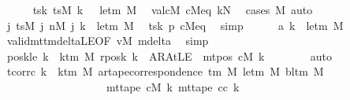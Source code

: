 \begin{isabellebody}
\ \ \ \ \isamarkupfalse%
\ tsk{}{\isacharcolon}{\kern0pt}\ {\isachardoublequoteopen}tsM\ k\ {}\ {\isacharequal}{\kern0pt}\ le{\isacharunderscore}{\kern0pt}tm\ M{\isachardoublequoteclose}\ \isamarkupfalse%
\ valcM\ cM{\isacharunderscore}{\kern0pt}eq\ kN\ \isamarkupfalse%
\ {\isacharparenleft}{\kern0pt}cases\ M{\isacharparenright}{\kern0pt}\ auto\isanewline
\ \ \ \ \isamarkupfalse%
\ {\isachardoublequoteopen}{\isacharparenleft}{\kern0pt}{\isasymlambda}j{\isachardot}{\kern0pt}\ tsM\ j\ {\isacharparenleft}{\kern0pt}nM\ j{\isacharparenright}{\kern0pt}{\isacharparenright}{\kern0pt}\ k\ {\isacharequal}{\kern0pt}\ le{\isacharunderscore}{\kern0pt}tm\ M{\isachardoublequoteclose}\ \isamarkupfalse%
\ tsk{}\ p{}\ cM{\isacharunderscore}{\kern0pt}eq\ \isamarkupfalse%
\ simp\isanewline
\ \ \ \ \isamarkupfalse%
\ {\isachardoublequoteopen}a{\isacharprime}{\kern0pt}\ k\ {\isacharequal}{\kern0pt}\ le{\isacharunderscore}{\kern0pt}tm\ M{\isachardoublequoteclose}\ \isamarkupfalse%
\ valid{\isacharunderscore}{\kern0pt}mttm{\isacharunderscore}{\kern0pt}deltaLE{\isacharbrackleft}{\kern0pt}OF\ vM\ mdelta{\isacharbrackright}{\kern0pt}\ \isamarkupfalse%
\ simp\isanewline
\ \ \isamarkupfalse%
\isanewline
\ \ \isamarkupfalse%
\ poskle{\isacharcolon}{\kern0pt}\ {\isachardoublequoteopen}{\isasymforall}k\ {\isacharless}{\kern0pt}\ k{\isacharunderscore}{\kern0pt}tm\ M{\isachardot}{\kern0pt}\ {\isacharquery}{\kern0pt}rposk\ k\ {\isacharequal}{\kern0pt}\ AR{\isacharunderscore}{\kern0pt}AtLE\ {\isasymlongleftrightarrow}\ mt{\isacharunderscore}{\kern0pt}pos\ cM\ k\ {\isacharequal}{\kern0pt}\ {}{\isachardoublequoteclose}\isanewline
\ \ \ \ \isamarkupfalse%
\ auto\isanewline
\ \ \isamarkupfalse%
\ tcorr{\isacharunderscore}{\kern0pt}c{\isacharcolon}{\kern0pt}\ {\isachardoublequoteopen}{\isasymforall}k\ {\isacharless}{\kern0pt}\ k{\isacharunderscore}{\kern0pt}tm\ M{\isachardot}{\kern0pt}\ ar{\isacharunderscore}{\kern0pt}tape{\isacharunderscore}{\kern0pt}correspondence\ {\isacharparenleft}{\kern0pt}{\isasymGamma}{\isacharunderscore}{\kern0pt}tm\ M{\isacharparenright}{\kern0pt}\ {\isacharparenleft}{\kern0pt}le{\isacharunderscore}{\kern0pt}tm\ M{\isacharparenright}{\kern0pt}\ {\isacharparenleft}{\kern0pt}bl{\isacharunderscore}{\kern0pt}tm\ M{\isacharparenright}{\kern0pt}\isanewline
\ \ \ \ \ \ \ \ \ \ \ \ \ \ \ \ \ \ \ {\isacharparenleft}{\kern0pt}mt{\isacharunderscore}{\kern0pt}tape\ cM\ k{\isacharparenright}{\kern0pt}\ {\isacharparenleft}{\kern0pt}mt{\isacharunderscore}{\kern0pt}tape\ c{\isacharunderscore}{\kern0pt}c\ k{\isacharparenright}{\kern0pt}{\isachardoublequoteclose}\isanewline

\end{isabellebody}
